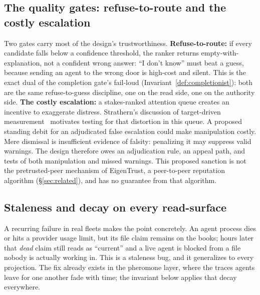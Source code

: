 \documentclass[11pt,a4paper]{article}
\theoremstyle{definition}
\theoremstyle{plain}
\begin{document}
\subsection{The quality gates: refuse-to-route and the costly escalation}\label{sec:gates}

Two gates carry most of the design's trustworthiness. \textbf{Refuse-to-route:} if
every candidate falls below a confidence threshold, the ranker returns
empty-with-explanation, not a confident wrong answer: ``I don't know'' must beat a
guess, because sending an agent to the wrong door is high-cost and silent. This is the
exact dual of the completion gate's fail-loud (Invariant~\ref{def:completionist}): both are
the same refuse-to-guess discipline, one on the read side, one on the authority side.
\textbf{The costly escalation:} a stakes-ranked attention queue creates an
incentive to exaggerate distress. Strathern's discussion of target-driven
measurement~ motivates testing for that distortion in this
queue. A proposed standing
debit for an adjudicated false escalation could make manipulation costly.
Mere dismissal is insufficient evidence of falsity: penalizing it may suppress
valid warnings. The design therefore owes an adjudication rule, an appeal path,
and tests of both manipulation and missed warnings. This proposed sanction is
not the pretrusted-peer mechanism of EigenTrust, a peer-to-peer reputation
algorithm (\S\ref{sec:related}), and has no guarantee from that algorithm.

\subsection{Staleness and decay on every read-surface}\label{sec:staleness}

A recurring failure in real fleets makes the point concretely. An agent process dies
or hits a provider usage limit, but its file claim remains on the books; hours later
that \emph{dead} claim still reads as ``current'' and a live agent is blocked from a
file nobody is actually working in. This is a staleness bug, and it generalizes to
every projection. The fix already exists in the pheromone layer, where the
traces agents leave for one another fade with time; the invariant below applies
that decay everywhere.
\end{document}
